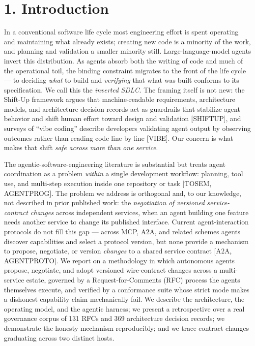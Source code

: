 \documentclass[11pt]{article}
\begin{document}
\section*{1. Introduction}
In a conventional software life cycle most engineering effort is spent operating and maintaining what
already exists; creating new code is a minority of the work, and planning and validation a smaller
minority still. Large-language-model agents invert this distribution. As agents absorb both the
writing of code and much of the operational toil, the binding constraint migrates to the front of the
life cycle --- to deciding \emph{what} to build and \emph{verifying} that what was built conforms to
its specification. We call this the \emph{inverted SDLC}. The framing itself is not new: the Shift-Up
framework argues that machine-readable requirements, architecture models, and architecture decision
records act as guardrails that stabilize agent behavior and shift human effort toward design and
validation [SHIFTUP], and surveys of ``vibe coding'' describe developers validating agent output by
observing outcomes rather than reading code line by line [VIBE]. Our concern is what makes that shift
\emph{safe across more than one service}.

The agentic-software-engineering literature is substantial but treats agent coordination as a problem
\emph{within} a single development workflow: planning, tool use, and multi-step execution inside one
repository or task [TOSEM, AGENTPROG]. The problem we address is orthogonal and, to our knowledge, not
described in prior published work: the \emph{negotiation of versioned service-contract changes} across
independent services, when an agent building one feature needs another service to change its published
interface. Current agent-interaction protocols do not fill
this gap --- across MCP, A2A, and related schemes agents discover capabilities and select a protocol
version, but none provide a mechanism to propose, negotiate, or version \emph{changes} to a shared
service contract [A2A, AGENTPROTO]. We report on a methodology in which autonomous agents propose,
negotiate, and adopt versioned wire-contract changes across a multi-service estate, governed by a
Request-for-Comments (RFC) process the agents themselves execute, and verified by a conformance suite
whose strict mode makes a dishonest capability claim mechanically fail. We describe the architecture,
the operating model, and the agentic harness; we present a retrospective over a real governance
corpus of 131 RFCs and 369 architecture decision records; we demonstrate the honesty mechanism
reproducibly; and we trace contract changes graduating across two distinct hosts.
\end{document}

